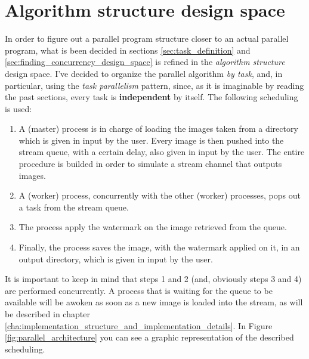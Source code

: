     \section{Algorithm structure design space} %
    \label{sec:algorithm_structure_design_space}
        In order to figure out a parallel program structure closer to an actual parallel program, what is been
        decided in sections \ref{sec:task_definition} and \ref{sec:finding_concurrency_design_space} is refined
        in the \textit{algorithm structure} design space. I've decided to organize the parallel algorithm
        \textit{by task}, and, in particular, using the \textit{task parallelism} pattern, since, as it is
        imaginable by reading the past sections, every task is \textbf{independent} by itself. The following
        scheduling is used:
        \begin{enumerate}
            \item A (master) process is in charge of loading the images taken from a directory which is given in
            input by the user. Every image is then pushed into the stream queue, with a certain delay, also
            given in input by the user. The entire procedure is builded in order to simulate a stream channel
            that outputs images.
            \item A (worker) process, concurrently with the other (worker) processes, pops out a task from the stream queue.
            \item The process apply the watermark on the image retrieved from the queue.
            \item Finally, the process saves the image, with the watermark applied on it, in an output
            directory, which is given in input by the user.
        \end{enumerate}
        It is important to keep in mind that steps 1 and 2 (and, obviously steps 3 and 4) are performed
        concurrently. A process that is waiting for the queue to be available will be awoken as soon as a new
        image is loaded into the stream, as will be described in chapter
        \ref{cha:implementation_structure_and_implementation_details}. In Figure \ref{fig:parallel_architecture}
        you can see a graphic representation of the described scheduling.

